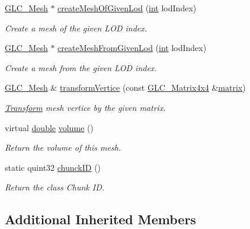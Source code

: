 \begin{DoxyCompactItemize}
\hyperlink{class_g_l_c___mesh}{G\-L\-C\-\_\-\-Mesh} $\ast$ \hyperlink{class_g_l_c___mesh_a1ddc6ff16ecab7d8fcd31959b686f4e4}{create\-Mesh\-Of\-Given\-Lod} (\hyperlink{ioapi_8h_a787fa3cf048117ba7123753c1e74fcd6}{int} lod\-Index)
\begin{DoxyCompactList}\small\item\em Create a mesh of the given L\-O\-D index. \end{DoxyCompactList}\item 
\hyperlink{class_g_l_c___mesh}{G\-L\-C\-\_\-\-Mesh} $\ast$ \hyperlink{class_g_l_c___mesh_ab3979c362431fb7c37ed50dccc9db9c9}{create\-Mesh\-From\-Given\-Lod} (\hyperlink{ioapi_8h_a787fa3cf048117ba7123753c1e74fcd6}{int} lod\-Index)
\begin{DoxyCompactList}\small\item\em Create a mesh from the given L\-O\-D index. \end{DoxyCompactList}\item 
\hyperlink{class_g_l_c___mesh}{G\-L\-C\-\_\-\-Mesh} \& \hyperlink{class_g_l_c___mesh_a657c7c4ca3ddcc58f708cc1c3704129b}{transform\-Vertice} (const \hyperlink{class_g_l_c___matrix4x4}{G\-L\-C\-\_\-\-Matrix4x4} \&\hyperlink{glext_8h_a7b24a3f2f56eb1244ae69dacb4fecb6f}{matrix})
\begin{DoxyCompactList}\small\item\em \hyperlink{class_transform}{Transform} mesh vertice by the given matrix. \end{DoxyCompactList}\item 
virtual \hyperlink{_super_l_u_support_8h_a8956b2b9f49bf918deed98379d159ca7}{double} \hyperlink{class_g_l_c___mesh_a451008a96ed2c041ef15cad1ac4a3830}{volume} ()
\begin{DoxyCompactList}\small\item\em Return the volume of this mesh. \end{DoxyCompactList}\item 
static quint32 \hyperlink{class_g_l_c___mesh_a0b906eebc26e6447251c0abbed30fdfc}{chunck\-I\-D} ()
\begin{DoxyCompactList}\small\item\em Return the class Chunk I\-D. \end{DoxyCompactList}\end{DoxyCompactItemize}
\subsection*{Additional Inherited Members}


